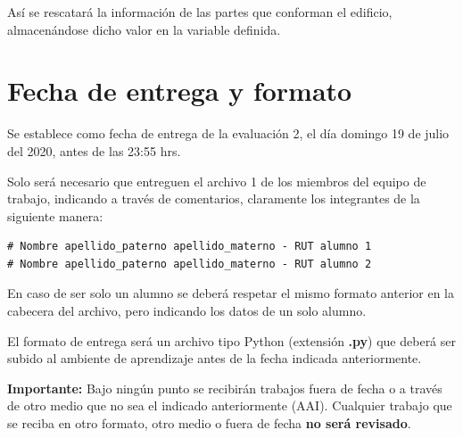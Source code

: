 \documentclass[]{article}
\begin{document}
    Así se rescatará la información de las partes que conforman el edificio, almacenándose dicho valor en la variable definida.

    \section{Fecha de entrega y formato}
    Se establece como fecha de entrega de la evaluación 2, el día domingo 19 de julio del 2020, antes de las 23:55 hrs.

    Solo será necesario que entreguen el archivo 1 de los miembros del equipo de trabajo, indicando a través de comentarios, claramente los integrantes de la siguiente manera:\\

    \begin{verbatim}
# Nombre apellido_paterno apellido_materno - RUT alumno 1
# Nombre apellido_paterno apellido_materno - RUT alumno 2
    \end{verbatim}
    
    En caso de ser solo un alumno se deberá respetar el mismo formato anterior en la cabecera del archivo, pero indicando los datos de un solo alumno.

    El formato de entrega será un archivo tipo Python (extensión \textbf{.py}) que deberá ser subido al ambiente de aprendizaje antes de la fecha indicada anteriormente.

    \textbf{Importante:} Bajo ningún punto se recibirán trabajos fuera de fecha o a través de otro medio que no sea el indicado anteriormente (AAI). Cualquier trabajo que se reciba en otro formato, otro medio o fuera de fecha \textbf{no será revisado}.
\end{document}
